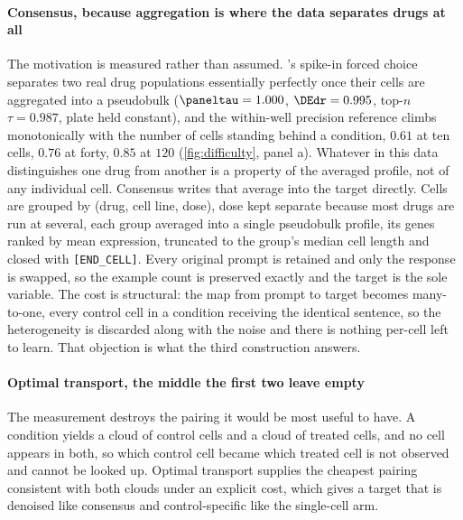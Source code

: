 \paragraph{Consensus, because aggregation is where the data separates drugs at
all} The motivation is measured rather than assumed. 's
spike-in forced choice separates two real drug populations essentially perfectly
once their cells are aggregated into a pseudobulk ($\paneltau = 1.000$,
$\DEdr = 0.995$, top-$n$ $\tau = 0.987$, plate held constant), and the within-well
precision reference climbs monotonically with the number of cells standing behind
a condition, $0.61$ at ten cells, $0.76$ at forty, $0.85$ at $120$
(\cref{fig:difficulty}, panel a). Whatever in this data distinguishes one drug
from another is a property of the averaged profile, not of any individual cell.
Consensus writes that average into the target directly. Cells are grouped by
(drug, cell line, dose), dose kept separate because most drugs are run at several,
each group averaged into a single pseudobulk profile, its genes ranked by mean
expression, truncated to the group's median cell length and closed with
\texttt{[END\_CELL]}. Every original prompt is retained and only the response is
swapped, so the example count is preserved exactly and the target is the sole
variable. The cost is structural: the map from prompt to target becomes
many-to-one, every control cell in a condition receiving the identical sentence,
so the heterogeneity is discarded along with the noise and there is nothing
per-cell left to learn. That objection is what the third construction answers.

\paragraph{Optimal transport, the middle the first two leave empty} The
measurement destroys the pairing it would be most useful to have. A condition
yields a cloud of control cells and a cloud of treated cells, and no cell appears
in both, so which control cell became which treated cell is not observed and
cannot be looked up. Optimal transport supplies the cheapest pairing consistent
with both clouds under an explicit cost, which gives a target that is denoised
like consensus and control-specific like the single-cell arm.

